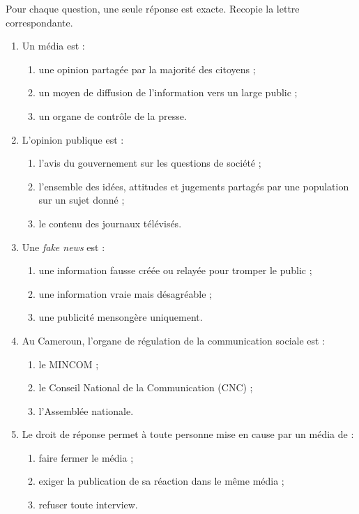 \documentclass[11pt]{article}
\begin{document}
\begin{exercice}
Pour chaque question, une seule réponse est exacte. Recopie la lettre correspondante.
\begin{enumerate}
\item Un média est :
\begin{enumerate}
\item[a)] une opinion partagée par la majorité des citoyens ;
\item[b)] un moyen de diffusion de l'information vers un large public ;
\item[c)] un organe de contrôle de la presse.
\end{enumerate}
\item L'opinion publique est :
\begin{enumerate}
\item[a)] l'avis du gouvernement sur les questions de société ;
\item[b)] l'ensemble des idées, attitudes et jugements partagés par une population sur un sujet donné ;
\item[c)] le contenu des journaux télévisés.
\end{enumerate}
\item Une \emph{fake news} est :
\begin{enumerate}
\item[a)] une information fausse créée ou relayée pour tromper le public ;
\item[b)] une information vraie mais désagréable ;
\item[c)] une publicité mensongère uniquement.
\end{enumerate}
\item Au Cameroun, l'organe de régulation de la communication sociale est :
\begin{enumerate}
\item[a)] le MINCOM ;
\item[b)] le Conseil National de la Communication (CNC) ;
\item[c)] l'Assemblée nationale.
\end{enumerate}
\item Le droit de réponse permet à toute personne mise en cause par un média de :
\begin{enumerate}
\item[a)] faire fermer le média ;
\item[b)] exiger la publication de sa réaction dans le même média ;
\item[c)] refuser toute interview.
\end{enumerate}
\end{enumerate}
\end{exercice}
\end{document}
